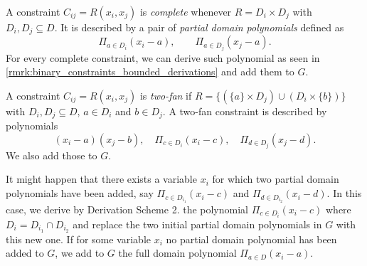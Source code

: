 \documentclass[11pt]{article}
\newcommand{\1}{\textbf{1}}
\begin{document}
A constraint $C_{ij} = R(x_i, x_j)$ is \textit{complete} whenever $R = D_i \times D_j$ with $D_i, D_j \subseteq D$. It is described by a pair of \emph{partial domain polynomials} defined as 
\begin{equation*}
    \Pi_{a \in D_i} (x_i - a), \qquad \Pi_{a \in D_j} (x_j - a).
\end{equation*}
For every complete constraint, we can derive such polynomial as seen in \cref{rmrk:binary_constraints_bounded_derivations} and add them to $G$.

A constraint $C_{ij} = R(x_i, x_j)$ is \textit{two-fan} if $R = \{(\{a\} \times D_j) \cup (D_i \times \{b\})\}$ with $D_i, D_j \subseteq D$, $a \in D_i$ and $b \in D_j$. A two-fan constraint is described by polynomials
\begin{equation*}
    (x_i - a)(x_j - b), \quad \Pi_{c \in D_i} (x_i - c), \quad \Pi_{d \in D_j} (x_j - d).
\end{equation*}
We also add those to $G$. 

It might happen that there exists a variable $x_i$ for which two partial domain polynomials have been added, say $\Pi_{c \in D_{i_1}} (x_i - c)$ and $\Pi_{d \in D_{i_2}} (x_i - d)$. In this case, we derive by Derivation Scheme 2. the polynomial $\Pi_{c \in D_i} (x_i - c)$ where $D_i = D_{i_1} \cap D_{i_2}$ and replace the two initial partial domain polynomials in $G$ with this new one. If for some variable $x_i$ no partial domain polynomial has been added to $G$, we add to $G$ the full domain polynomial $\Pi_{a \in D} (x_i - a)$.
\end{document}
